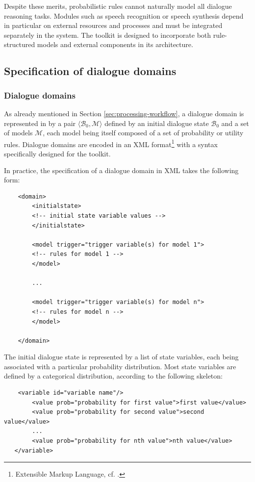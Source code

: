Despite these merits, probabilistic rules cannot naturally model all dialogue reasoning tasks.  Modules such as speech recognition or speech synthesis depend in particular on external resources and processes and must be integrated separately in the system. The \opendial{} toolkit is designed to incorporate both rule-structured models and external components in its architecture. 
\subsection{Specification of dialogue domains}
\label{sec:domain-specification}

\subsubsection*{Dialogue domains}

As already mentioned in Section \ref{sec:processing-workflow}, a dialogue domain is represented in \opendial{} by a pair $\langle \mathcal{B}_0, \mathcal{M} \rangle$ defined by an initial dialogue state $\mathcal{B}_0$ and a set of models $\mathcal{M}$, each model being itself composed of a set of probability or utility rules. Dialogue domains are encoded in an XML format\footnote{Extensible Markup Language, cf. .} with a syntax specifically designed for the toolkit. 

In practice, the specification of a dialogue domain in XML takes the following form:
\lstset{language=XML}
\begin{lstlisting}
    <domain> 
        <initialstate>
		<!-- initial state variable values -->
        </initialstate>

        <model trigger="trigger variable(s) for model 1">
   		<!-- rules for model 1 -->
     	</model>
     	
     	...
     	
     	<model trigger="trigger variable(s) for model n">
   		<!-- rules for model n -->
     	</model>

    </domain>
\end{lstlisting}\vspace{2mm}

The initial dialogue state is represented by a list of state variables, each being associated with a particular probability distribution.  Most state variables are defined by a categorical distribution, according to the following skeleton:

\vspace{3mm}\begin{lstlisting}
    <variable id="variable name"/>
        <value prob="probability for first value">first value</value>
        <value prob="probability for second value">second value</value>
		...
        <value prob="probability for nth value">nth value</value>
   </variable>  
\end{lstlisting}\vspace{2mm}

